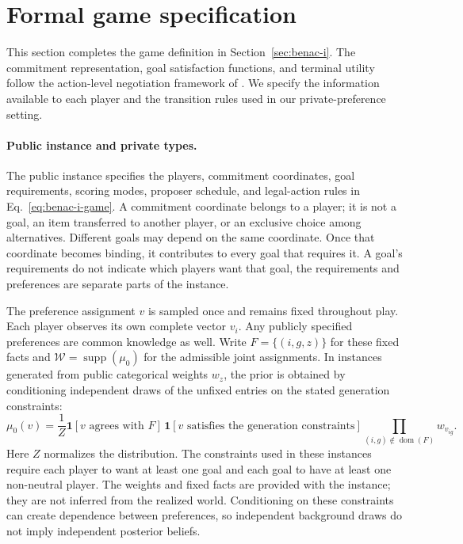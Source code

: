 \section{Formal game specification}
\label{app:game}

This section completes the game definition in Section~\ref{sec:benac-i}.
The commitment representation, goal satisfaction functions, and terminal
utility follow the action-level negotiation framework of
\citet{benac2026benchmark}. We specify the information available to each
player and the transition rules used in our private-preference setting.

\paragraph{Public instance and private types.}
The public instance specifies the players, commitment coordinates, goal
requirements, scoring modes, proposer schedule, and legal-action rules in
Eq.~\ref{eq:benac-i-game}. A commitment coordinate belongs to a player;
it is not a goal, an item transferred to another player, or an exclusive
choice among alternatives. Different goals may depend on the same
coordinate. Once that coordinate becomes binding, it contributes to every
goal that requires it. A goal's requirements do not indicate which players
want that goal, the requirements and preferences are separate parts of the
instance.

The preference assignment $v$ is sampled once and remains fixed throughout
play. Each player observes its own complete vector $v_i$. Any publicly
specified preferences are common knowledge as well. Write
$F=\{(i,g,z)\}$ for these fixed facts and
$\mathcal W=\operatorname{supp}(\mu_0)$ for the admissible joint assignments.
In instances generated from public categorical weights $w_z$, the prior is
obtained by conditioning independent draws of the unfixed entries on the
stated generation constraints:
\begin{equation}
 \mu_0(v)=\frac{1}{Z}
 \mathbf 1[v\text{ agrees with }F]\,
 \mathbf 1[v\text{ satisfies the generation constraints}]
 \prod_{(i,g)\notin\operatorname{dom}(F)} w_{v_{ig}}.
 \label{eq:game-prior}
\end{equation}
Here $Z$ normalizes the distribution. The constraints used in these
instances require each player to want at least one goal and each goal to
have at least one non-neutral player. The weights and fixed facts are
provided with the instance; they are not inferred from the realized world.
Conditioning on these constraints can create dependence between preferences,
so independent background draws do not imply independent posterior beliefs.

